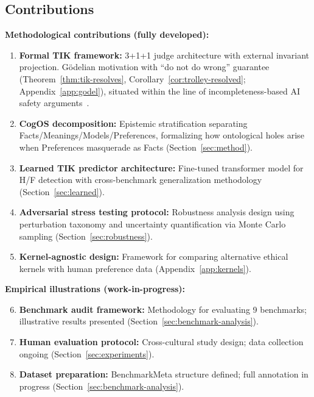 \documentclass[11pt]{article}
\begin{document}
\subsection{Contributions}

\textbf{Methodological contributions (fully developed):}

\begin{enumerate}
\item \textbf{Formal TIK framework:} 3+1+1 judge architecture with external invariant projection. G\"{o}delian motivation with ``do not do wrong'' guarantee (Theorem~\ref{thm:tik-resolves}, Corollary~\ref{cor:trolley-resolved}; Appendix~\ref{app:godel}), situated within the line of incompleteness-based AI safety arguments~\citep{panigrahy2025limitations,fallenstein2014problems,marks2023informal}.

\item \textbf{CogOS decomposition:} Epistemic stratification separating Facts/Meanings/Models/Preferences, formalizing how ontological holes arise when Preferences masquerade as Facts (Section~\ref{sec:method}).

\item \textbf{Learned TIK predictor architecture:} Fine-tuned transformer model for H/F detection with cross-benchmark generalization methodology (Section~\ref{sec:learned}).

\item \textbf{Adversarial stress testing protocol:} Robustness analysis design using perturbation taxonomy and uncertainty quantification via Monte Carlo sampling (Section~\ref{sec:robustness}).

\item \textbf{Kernel-agnostic design:} Framework for comparing alternative ethical kernels with human preference data (Appendix~\ref{app:kernels}).
\end{enumerate}

\textbf{Empirical illustrations (work-in-progress):}

\begin{enumerate}\setcounter{enumi}{5}
\item \textbf{Benchmark audit framework:} Methodology for evaluating 9 benchmarks; illustrative results presented (Section~\ref{sec:benchmark-analysis}).

\item \textbf{Human evaluation protocol:} Cross-cultural study design; data collection ongoing (Section~\ref{sec:experiments}).

\item \textbf{Dataset preparation:} BenchmarkMeta structure defined; full annotation in progress (Section~\ref{sec:benchmark-analysis}).
\end{enumerate}
\end{document}
